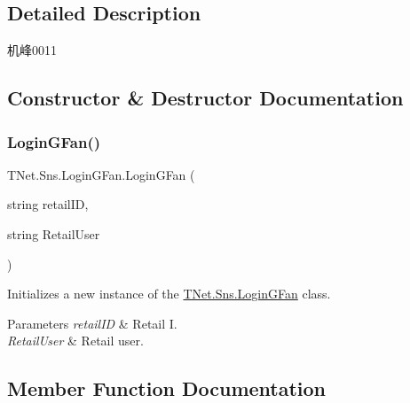 \subsection{Detailed Description}
机峰0011 



\subsection{Constructor \& Destructor Documentation}
\mbox{\label{class_t_net_1_1_sns_1_1_login_g_fan_a82a0e153bfcb0505d69974e488fa2573}} 
\subsubsection{\texorpdfstring{Login\+G\+Fan()}{LoginGFan()}}
{\footnotesize\ttfamily T\+Net.\+Sns.\+Login\+G\+Fan.\+Login\+G\+Fan (\begin{DoxyParamCaption}\item[{string}]{retail\+ID,  }\item[{string}]{Retail\+User }\end{DoxyParamCaption})}



Initializes a new instance of the \mbox{\hyperlink{class_t_net_1_1_sns_1_1_login_g_fan}{T\+Net.\+Sns.\+Login\+G\+Fan}} class. 


\begin{DoxyParams}{Parameters}
{\em retail\+ID} & Retail I.\\
\hline
{\em Retail\+User} & Retail user.\\
\hline
\end{DoxyParams}


\subsection{Member Function Documentation}
\mbox{\label{class_t_net_1_1_sns_1_1_login_g_fan_abdd4ebf96e43f40d650e107f598109dc}} 
